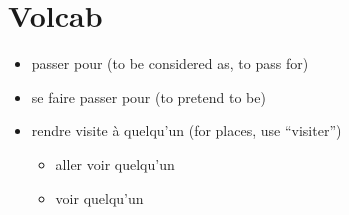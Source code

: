 \documentclass{article}
\begin{document}
\section{Volcab}
    \begin{itemize}
        \item passer pour (to be considered as, to pass for)
        \item se faire passer pour (to pretend to be)
        \item rendre visite à quelqu'un (for places, use ``visiter'')
        \begin{itemize}
            \item aller voir quelqu'un
            \item voir quelqu'un
        \end{itemize}
    \end{itemize}
\end{document}
